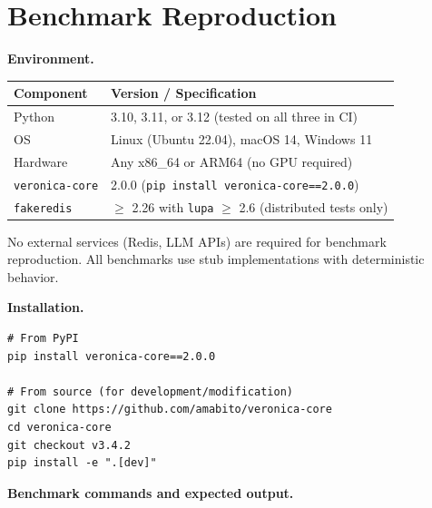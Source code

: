 \documentclass[11pt]{article}
\begin{document}
\section{Benchmark Reproduction}
\label{sec:appendix-benchmarks}

\textbf{Environment.}

\begin{table}[!ht]
\centering
\begin{tabular}{@{}ll@{}}
\toprule
\textbf{Component} & \textbf{Version / Specification} \\
\midrule
Python & 3.10, 3.11, or 3.12 (tested on all three in CI) \\
OS & Linux (Ubuntu 22.04), macOS 14, Windows 11 \\
Hardware & Any x86\_64 or ARM64 (no GPU required) \\
\texttt{veronica-core} & 2.0.0 (\texttt{pip install veronica-core==2.0.0}) \\
\texttt{fakeredis} & $\geq$ 2.26 with \texttt{lupa} $\geq$ 2.6
(distributed tests only) \\
\bottomrule
\end{tabular}
\end{table}

No external services (Redis, LLM APIs) are required for benchmark
reproduction. All benchmarks use stub implementations with deterministic
behavior.

\textbf{Installation.}

\begin{lstlisting}[style=bash]
# From PyPI
pip install veronica-core==2.0.0

# From source (for development/modification)
git clone https://github.com/amabito/veronica-core
cd veronica-core
git checkout v3.4.2
pip install -e ".[dev]"
\end{lstlisting}

\textbf{Benchmark commands and expected output.}
\end{document}
